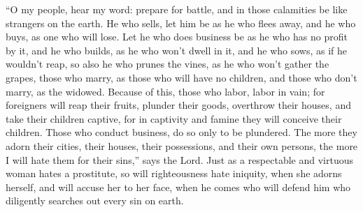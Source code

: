  ``O my people, hear my word: prepare for battle, and in
those calamities be like strangers on the earth.  He who
sells, let him be as he who flees away, and he who buys, as one who will
lose.  Let he who does business be as he who has no profit
by it, and he who builds, as he who won't dwell in it,  and
he who sows, as if he wouldn't reap, so also he who prunes the vines, as
he who won't gather the grapes,  those who marry, as those
who will have no children, and those who don't marry, as the widowed.
 Because of this, those who labor, labor in vain;
 for foreigners will reap their fruits, plunder their
goods, overthrow their houses, and take their children captive, for in
captivity and famine they will conceive their children. 
Those who conduct business, do so only to be plundered. The more they
adorn their cities, their houses, their possessions, and their own
persons,  the more I will hate them for their sins,'' says
the Lord.  Just as a respectable and virtuous woman hates a
prostitute,  so will righteousness hate iniquity, when she
adorns herself, and will accuse her to her face, when he comes who will
defend him who diligently searches out every sin on earth.

